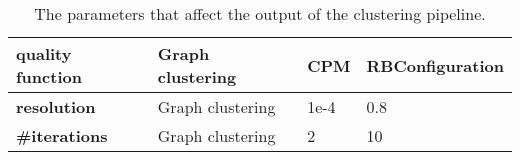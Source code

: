 \begin{table}[H]
{\begin{tabular}{|l|l|l|l|}
            \textbf{quality function}   & \cellcolor[HTML]{72B980}Graph clustering & CPM                        & RBConfiguration            \\ \hline
            \textbf{resolution}         & \cellcolor[HTML]{72B980}Graph clustering & 1e-4                       & 0.8                        \\ \hline
            \textbf{\#iterations}       & \cellcolor[HTML]{72B980}Graph clustering & 2                          & 10                         \\ \hline
        \end{tabular}}
    \caption{\label{tab:param}The parameters that affect the output of the clustering pipeline.}
\end{table}